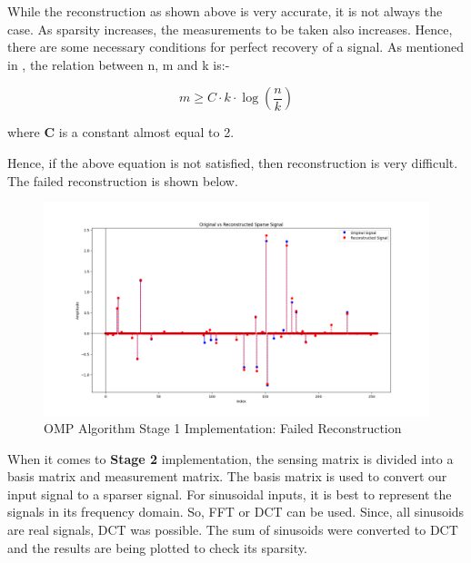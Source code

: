\documentclass[
  letterpaper,
  DIV=11,
  numbers=noendperiod]{scrartcl}
\begin{document}
While the reconstruction as shown above is very accurate, it is not
always the case. As sparsity increases, the measurements to be taken
also increases. Hence, there are some necessary conditions for perfect
recovery of a signal. As mentioned in \autocite{rani-cs}, the relation
between n, m and k is:-

\begin{equation}
\boxed{
    m \geq C \cdot k \cdot \log\left(\frac{n}{k}\right)
}
\end{equation}

where \textbf{C} is a constant almost equal to 2.

Hence, if the above equation is not satisfied, then reconstruction is
very difficult. The failed reconstruction is shown below.

\begin{figure}[H]

{\centering \includegraphics[width=0.8\linewidth,height=\textheight,keepaspectratio]{abar-cs_files/mediabag/omp-alg-2561.png}

}

\caption{OMP Algorithm Stage 1 Implementation: Failed Reconstruction}

\end{figure}%

When it comes to \textbf{Stage 2} implementation, the sensing matrix is
divided into a basis matrix and measurement matrix. The basis matrix is
used to convert our input signal to a sparser signal. For sinusoidal
inputs, it is best to represent the signals in its frequency domain. So,
FFT or DCT can be used. Since, all sinusoids are real signals, DCT was
possible. The sum of sinusoids were converted to DCT and the results are
being plotted to check its sparsity.
\end{document}
